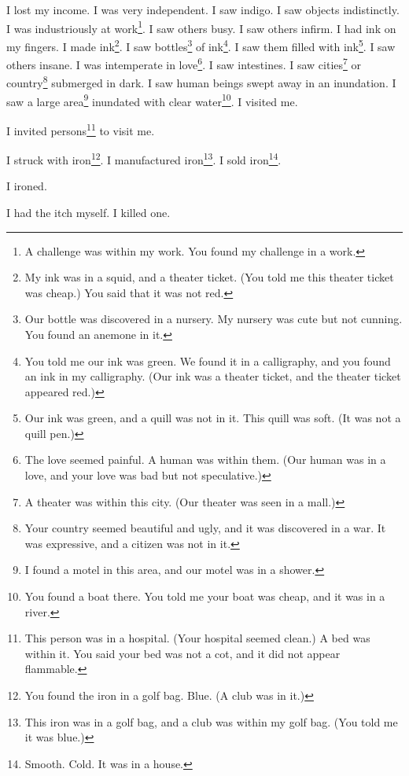 \documentclass[12pt]{book}
\begin{document}
 I lost my income. I was very independent. I saw indigo. I saw objects indistinctly. I was industriously at work\footnote{A challenge was within my work. You found my challenge in a work.}. I saw others busy. I saw others infirm. I had ink on my fingers. I made ink\footnote{My ink was in a squid, and a theater ticket. (You told me this theater ticket was cheap.) You said that it was not red.}. I saw bottles\footnote{Our bottle was discovered in a nursery. My nursery was cute but not cunning. You found an anemone in it.} of ink\footnote{You told me our ink was green. We found it in a calligraphy, and you found an ink in my calligraphy. (Our ink was a theater ticket, and the theater ticket appeared red.)}. I saw them filled with ink\footnote{Our ink was green, and a quill was not in it. This quill was soft. (It was not a quill pen.)}. I saw others insane. I was intemperate in love\footnote{The love seemed painful. A human was within them. (Our human was in a love, and your love was bad but not speculative.)}. I saw intestines. I saw cities\footnote{A theater was within this city. (Our theater was seen in a mall.)} or country\footnote{Your country seemed beautiful and ugly, and it was discovered in a war. It was expressive, and a citizen was not in it.} submerged in dark. I saw human beings swept away in an inundation. I saw a large area\footnote{I found a motel in this area, and our motel was in a shower.} inundated with clear water\footnote{You found a boat there. You told me your boat was cheap, and it was in a river.}. I visited me. 

 I invited persons\footnote{This person was in a hospital. (Your hospital seemed clean.) A bed was within it. You said your bed was not a cot, and it did not appear flammable.} to visit me. 

 I struck with iron\footnote{You found the iron in a golf bag. Blue. (A club was in it.)}. I manufactured iron\footnote{This iron was in a golf bag, and a club was within my golf bag. (You told me it was blue.)}. I sold iron\footnote{Smooth. Cold. It was in a house.}. 

 I ironed. 

 I had the itch myself. I killed one. 
\end{document}
